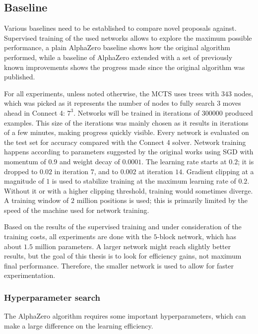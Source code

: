 \documentclass[12pt,onecolumn,oneside,titlepage]{article}
\begin{document}
\subsection{Baseline}

Various baselines need to be established to compare novel proposals against. Supervised training of the used networks allows to explore the maximum possible performance, 
a plain AlphaZero baseline shows how the original algorithm performed, while a baseline
of AlphaZero extended with a set of previously known improvements shows the progress made since the original algorithm was published.

For all experiments, unless noted otherwise, the MCTS uses trees with $343$ nodes, which was picked as it represents the number of nodes to fully search $3$ moves ahead in Connect 4: $7^3$.
Networks will be trained in iterations of $300000$ produced examples. This size of the iterations was mainly chosen as it results in iterations of a few minutes, making progress quickly visible. 
Every network is evaluated on the test set for accuracy compared with the Connect 4 solver.
Network training happens according to parameters suggested by the original works using SGD with momentum of $0.9$ and weight decay of $0.0001$. 
The learning rate starts at $0.2$; it is dropped to $0.02$ in iteration $7$, and to $0.002$ at iteration $14$. 
Gradient clipping at a magnitude of $1$ is used to stabilize training at the maximum learning rate of $0.2$. Without it or with a higher clipping threshold, training would sometimes diverge.
A training window of $2$ million positions is used; this is primarily limited by the speed of the machine used for network training.


Based on the results of the supervised training and under consideration of the training costs,
all experiments are done with the $5$-block network, which has about $1.5$ million parameters. A larger network might reach slightly better results,
but the goal of this thesis is to look for efficiency gains, not maximum final performance. Therefore, the smaller network is used to allow for faster experimentation.

\subsubsection{Hyperparameter search}

The AlphaZero algorithm requires some important hyperparameters, which can make a large difference on the learning efficiency. 
\end{document}
